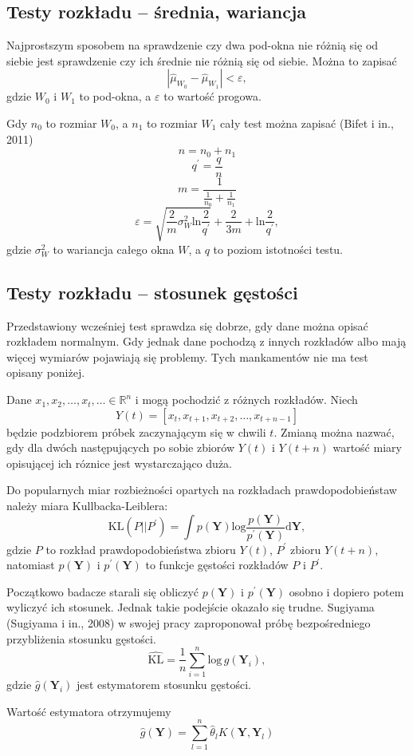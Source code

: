 \subsection{Testy rozkładu -- średnia, wariancja}
\label{sub:TestsMeanAndVar}
Najprostszym sposobem na sprawdzenie czy dwa pod-okna nie różnią się od siebie
jest sprawdzenie czy ich średnie nie różnią się od siebie.
Można to zapisać
$$ | \hat{\mu}_{W_{0}} - \hat{\mu}_{W_{1}} | < \varepsilon, $$
gdzie $W_{0}$ i $W_{1}$ to pod-okna, a $\varepsilon$ to wartość progowa.

Gdy $n_{0}$ to rozmiar $W_{0}$,
a $n_{1}$ to rozmiar $W_{1}$ cały test można zapisać (Bifet i in., 2011)
$$n = n_{0} + n_{1}$$
$$q^\prime = \frac{q}{n}$$
$$m=\frac{1}{\frac{1}{n_0}+\frac{1}{n_1}}$$
$$\varepsilon = \sqrt{\frac{2}{m} \sigma^{2}_{W} \mbox{ln}\frac{2}{q^\prime}} + \frac{2}{3m} + \mbox{ln}\frac{2}{q^\prime},$$
gdzie $\sigma^{2}_{W}$ to wariancja całego okna $W$,
a $q$ to poziom istotności testu.
\subsection{Testy rozkładu -- stosunek gęstości}
\label{sub:TestDensityRatio}
Przedstawiony wcześniej test sprawdza się dobrze,
gdy dane można opisać rozkładem normalnym.
Gdy jednak dane pochodzą z innych rozkładów albo mają więcej wymiarów pojawiają się problemy.
Tych mankamentów nie ma test opisany poniżej.

Dane $x_1,x_2,\ldots,x_t,\ldots \in \mathbb{R}^n$ i mogą pochodzić z różnych rozkładów.
Niech
$$ Y(t) = [{x_t, x_{t+1}, x_{t+2}, \ldots, x_{t+n-1}}]$$
będzie podzbiorem próbek zaczynającym się w chwili $t$.
Zmianą można nazwać,
gdy dla dwóch następujących po sobie zbiorów $Y(t)$ i $Y(t+n)$
wartość miary opisującej ich róznice jest wystarczająco duża.

Do popularnych miar rozbieżności opartych na rozkładach prawdopodobieństaw należy miara Kullbacka-Leiblera:
$$\mbox{KL}(P||P^\prime) = \int p(\textbf{Y}) \mbox{log}\frac{p(\textbf{Y})}{p^\prime(\textbf{Y})} \mbox{d}\textbf{Y},$$
gdzie $P$ to rozkład prawdopodobieństwa zbioru $Y(t)$,
$P^\prime$ zbioru $Y(t+n)$,
natomiast $p(\textbf{Y})$ i $p^\prime(\textbf{Y})$ to funkcje gęstości rozkładów $P$ i $P^\prime$.

Początkowo badacze starali się obliczyć $p(\textbf{Y})$ i $p^\prime(\textbf{Y})$ osobno
i dopiero potem wyliczyć ich stosunek.
Jednak takie podejście okazało się trudne.
Sugiyama (Sugiyama i in., 2008) w swojej pracy zaproponował próbę bezpośredniego przybliżenia stosunku gęstości.
$$\hat{\mbox{KL}} = \frac{1}{n} \sum\limits_{i=1}^n \mbox{log}\,\hat{g}(\textbf{Y}_i),$$
gdzie $\hat{g}(\textbf{Y}_i)$ jest estymatorem stosunku gęstości.

Wartość estymatora otrzymujemy
$$\hat{g}(\textbf{Y}) = \sum\limits_{l=1}^n \hat{\theta}_l K(\textbf{Y}, \textbf{Y}_l)$$
